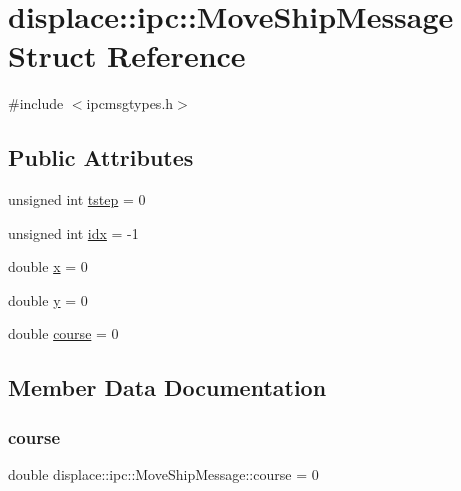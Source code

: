 \hypertarget{structdisplace_1_1ipc_1_1_move_ship_message}{}\section{displace\+::ipc\+::Move\+Ship\+Message Struct Reference}
\label{structdisplace_1_1ipc_1_1_move_ship_message}


{\ttfamily \#include $<$ipcmsgtypes.\+h$>$}

\subsection*{Public Attributes}
\begin{DoxyCompactItemize}
\item 
unsigned int \mbox{\hyperlink{structdisplace_1_1ipc_1_1_move_ship_message_a7a8999ee83e6223bab3cc525d74afeff}{tstep}} = 0
\item 
unsigned int \mbox{\hyperlink{structdisplace_1_1ipc_1_1_move_ship_message_a764e21a1ac4ed433d791b8f0ec767a80}{idx}} = -\/1
\item 
double \mbox{\hyperlink{structdisplace_1_1ipc_1_1_move_ship_message_a4c7858b26046f714dfb6921404de99b2}{x}} = 0
\item 
double \mbox{\hyperlink{structdisplace_1_1ipc_1_1_move_ship_message_a5cde4e8e199a2e939202b7f5662d9c92}{y}} = 0
\item 
double \mbox{\hyperlink{structdisplace_1_1ipc_1_1_move_ship_message_ae7c7110c5fdff11eed6eee8ae73f1c0d}{course}} = 0
\end{DoxyCompactItemize}


\subsection{Member Data Documentation}
\mbox{\label{structdisplace_1_1ipc_1_1_move_ship_message_ae7c7110c5fdff11eed6eee8ae73f1c0d}} 
\subsubsection{\texorpdfstring{course}{course}}
{\footnotesize\ttfamily double displace\+::ipc\+::\+Move\+Ship\+Message\+::course = 0}


